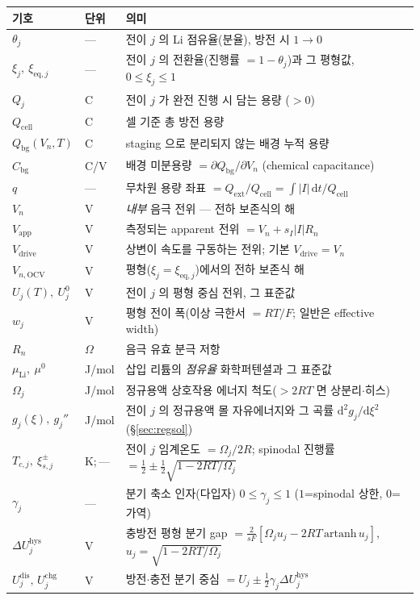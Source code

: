 \documentclass[11pt,a4paper]{article}
\newcommand{\dd}{\mathrm{d}}
\newcommand{\eq}{\mathrm{eq}}
\newcommand{\app}{\mathrm{app}}
\newcommand{\drive}{\mathrm{drive}}
\newcommand{\cell}{\mathrm{cell}}
\newcommand{\bg}{\mathrm{bg}}
\newcommand{\ext}{\mathrm{ext}}
\newcommand{\OCV}{\mathrm{OCV}}
\newcommand{\dis}{\mathrm{dis}}
\newcommand{\chg}{\mathrm{chg}}
\newcommand{\hys}{\mathrm{hys}}
\begin{document}
\begin{longtable}{p{} p{} p{}}
\toprule 기호 & 단위 & 의미 \\ \midrule \endhead
$\theta_j$ & --- & 전이 $j$ 의 Li 점유율(분율), 방전 시 $1\to0$ \\
$\xi_j,\ \xi_{\eq,j}$ & --- & 전이 $j$ 의 전환율(진행률 $=1-\theta_j$)과 그 평형값, $0\le\xi_j\le1$ \\
$Q_j$ & C & 전이 $j$ 가 완전 진행 시 담는 용량 ($>0$) \\
$Q_\cell$ & C & 셀 기준 총 방전 용량 \\
$Q_\bg(V_n,T)$ & C & staging 으로 분리되지 않는 배경 누적 용량 \\
$C_\bg$ & C/V & 배경 미분용량 $=\partial Q_\bg/\partial V_n$ (chemical capacitance) \\
$q$ & --- & 무차원 용량 좌표 $=Q_\ext/Q_\cell=\int|I|\,\dd t/Q_\cell$ \\
$V_n$ & V & \emph{내부} 음극 전위 — 전하 보존식의 해 \\
$V_\app$ & V & 측정되는 apparent 전위 $=V_n+s_I|I|R_n$ \\
$V_\drive$ & V & 상변이 속도를 구동하는 전위; 기본 $V_\drive=V_n$ \\
$V_{n,\OCV}$ & V & 평형($\xi_j=\xi_{\eq,j}$)에서의 전하 보존식 해 \\
$U_j(T),\ U_j^0$ & V & 전이 $j$ 의 평형 중심 전위, 그 표준값 \\
$w_j$ & V & 평형 전이 폭(이상 극한서 $=RT/F$; 일반은 effective width) \\
$R_n$ & $\Omega$ & 음극 유효 분극 저항 \\
$\mu_\mathrm{Li},\ \mu^0$ & J/mol & 삽입 리튬의 \emph{점유율} 화학퍼텐셜과 그 표준값 \\
$\Omega_j$ & J/mol & 정규용액 상호작용 에너지 척도($>2RT$ 면 상분리$\cdot$히스) \\
$g_j(\xi),\ g_j''$ & J/mol & 전이 $j$ 의 정규용액 몰 자유에너지와 그 곡률 $\dd^2g_j/\dd\xi^2$(\S\ref{sec:regsol}) \\
$T_{c,j},\ \xi_{s,j}^\pm$ & K;\,--- & 전이 $j$ 임계온도 $=\Omega_j/2R$; spinodal 진행률 $=\tfrac12\pm\tfrac12\sqrt{1-2RT/\Omega_j}$ \\
$\gamma_j$ & --- & 분기 축소 인자(다입자) $0\le\gamma_j\le1$ ($1$=spinodal 상한, $0$=가역) \\
$\Delta U_j^\hys$ & V & 충방전 평형 분기 gap $=\tfrac{2}{sF}[\Omega_j u_j-2RT\,\mathrm{artanh}\,u_j]$, $u_j=\sqrt{1-2RT/\Omega_j}$ \\
$U_j^{\dis},\,U_j^{\chg}$ & V & 방전$\cdot$충전 분기 중심 $=U_j\pm\tfrac12\gamma_j\Delta U_j^\hys$ \\

\end{longtable}
\end{document}
